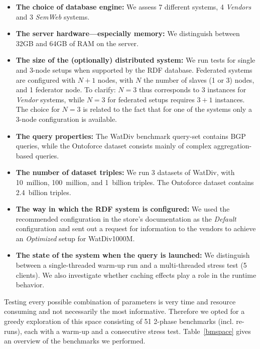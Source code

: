 \begin{itemize}
	\item \textbf{The choice of database engine:} We assess 7 different systems, 4 \emph{Vendors} and 3 \emph{SemWeb} systems.
	\item \textbf{The server hardware---especially memory:} We distinguish between 32GB and 64GB of RAM on the server.
	\item \textbf{The size of the (optionally) distributed system:} We run tests for single and 3-node setups when supported by the RDF database. Federated systems are configured with $N+1$ nodes, with $N$ the number of slaves (1 or 3) nodes, and 1 federator node. To clarify: $N=3$ thus corresponds to 3 instances for \emph{Vendor} systems, while $N=3$ for federated setups requires $3+1$ instances. The choice for $N=3$ is related to the fact that for one of the systems only a 3-node configuration is available.
	\item \textbf{The query properties:} The WatDiv benchmark query-set contains BGP queries, while the Ontoforce dataset consists mainly of complex aggregation-based queries.
	\item \textbf{The number of dataset triples:} We run 3 datasets of WatDiv, with 10~million, 100~million, and 1~billion triples. The Ontoforce dataset contains 2.4~billion triples.
	\item \textbf{The way in which the RDF system is configured:} We used the recommended configuration in the store's documentation as the \emph{Default} configuration and sent out a request for information to the vendors to achieve an \emph{Optimized} setup for WatDiv1000M.
	\item \textbf{The state of the system when the query is launched:} We distinguish between a single-threaded warm-up run and a multi-threaded stress test (5 clients). We also investigate whether caching effects play a role in the runtime behavior.
\end{itemize} 


Testing every possible combination of parameters is very time and resource consuming and not necessarily the most informative. Therefore we opted for a greedy exploration of this space consisting of 51 2-phase  benchmarks (incl. re-runs), each with a warm-up and a consecutive stress test. Table~\ref{bmspace} gives an overview of the benchmarks we performed.


